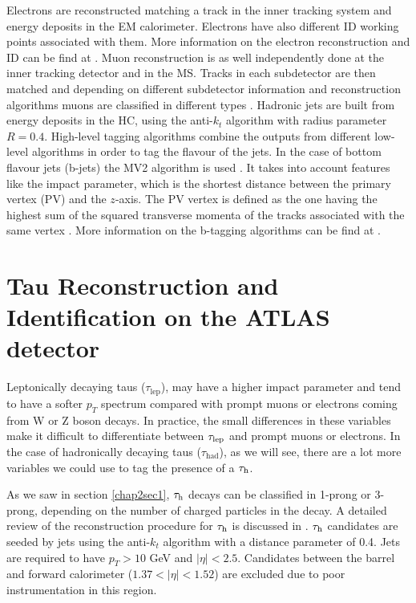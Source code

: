 Electrons are reconstructed matching a track in the inner tracking system and energy deposits in the EM calorimeter. Electrons have also different ID working points associated with them. More information on the electron reconstruction and ID can be find at \cite{Aaboud:2019ynx}. Muon reconstruction is as well independently done at the inner tracking detector and in the MS. Tracks in each subdetector are then matched and depending on different subdetector information and reconstruction algorithms muons are classified in different types \cite{Aad:2016jkr}. Hadronic jets are built from energy deposits in the HC, using the anti-$k_t$ algorithm with radius parameter $R=0.4$. High-level tagging algorithms combine the outputs from different low-level algorithms in order to tag the flavour of the jets. In the case of bottom flavour jets (b-jets) the MV2 algorithm is used \cite{ATLAS:2017bcq}. It takes into account features like the impact parameter, which is the shortest distance between the primary vertex (PV) and the $z$-axis. The PV vertex is defined as the one having the highest sum of the squared transverse momenta of the tracks associated with the same vertex \cite{Aaboud:2016rmg,TheATLAScollaboration:2015hdc}. More information on the b-tagging algorithms can be find at \cite{Aad:2019aic}.
  
\section{Tau Reconstruction and Identification on the ATLAS detector}
Leptonically decaying taus ($\tau_\text{lep}$), may have a higher impact parameter and tend to have a softer $p_T$ spectrum compared with prompt muons or electrons coming from W or Z boson decays. In practice, the small differences in these variables make it difficult to differentiate between $\tau_\text{lep}$ and prompt muons or electrons. In the case of hadronically decaying taus ($\tau_\text{had}$), as we will see, there are a lot more variables we could use to tag the presence of a $\tau_\text{h}$.

As we saw in section \ref{chap2sec1}, $\tau_\text{h}$ decays can be classified in 1-prong or 3-prong, depending on the number of charged particles in the decay. A detailed review of the reconstruction procedure for $\tau_\text{h}$ is discussed in \cite{Aad:2014rga}. $\tau_\text{h}$ candidates are seeded by jets using the anti-$k_t$ algorithm \cite{Cacciari:2008gp} with a distance parameter of 0.4. Jets are required to have $p_T>10$ GeV and $|\eta|<2.5$. Candidates between the barrel and forward calorimeter ($1.37<|\eta|<1.52$) are excluded due to poor instrumentation in this region.

